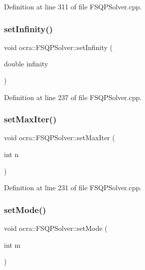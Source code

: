 Definition at line 311 of file F\+S\+Q\+P\+Solver.\+cpp.

\hypertarget{classocra_1_1FSQPSolver_a4fc0a343b2163f6100e2b3abee17ab46}{}\label{classocra_1_1FSQPSolver_a4fc0a343b2163f6100e2b3abee17ab46} 
\subsubsection{\texorpdfstring{set\+Infinity()}{setInfinity()}}
{\footnotesize\ttfamily void ocra\+::\+F\+S\+Q\+P\+Solver\+::set\+Infinity (\begin{DoxyParamCaption}\item[{double}]{infinity }\end{DoxyParamCaption})}



Definition at line 237 of file F\+S\+Q\+P\+Solver.\+cpp.

\hypertarget{classocra_1_1FSQPSolver_ab900ccf49e2e757fe67567a6da577675}{}\label{classocra_1_1FSQPSolver_ab900ccf49e2e757fe67567a6da577675} 
\subsubsection{\texorpdfstring{set\+Max\+Iter()}{setMaxIter()}}
{\footnotesize\ttfamily void ocra\+::\+F\+S\+Q\+P\+Solver\+::set\+Max\+Iter (\begin{DoxyParamCaption}\item[{int}]{n }\end{DoxyParamCaption})}



Definition at line 231 of file F\+S\+Q\+P\+Solver.\+cpp.

\hypertarget{classocra_1_1FSQPSolver_a543877c4c3022dfa4af88a38a40a08bd}{}\label{classocra_1_1FSQPSolver_a543877c4c3022dfa4af88a38a40a08bd} 
\subsubsection{\texorpdfstring{set\+Mode()}{setMode()}}
{\footnotesize\ttfamily void ocra\+::\+F\+S\+Q\+P\+Solver\+::set\+Mode (\begin{DoxyParamCaption}\item[{int}]{m }\end{DoxyParamCaption})}



